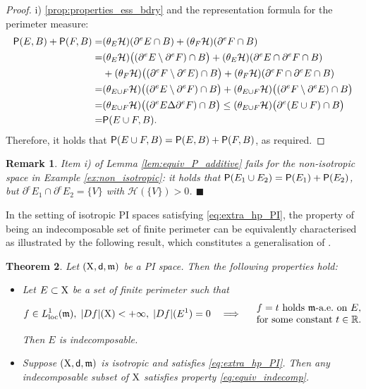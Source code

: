 \documentclass[reqno]{amsart}
\numberwithin{equation}{section}
\newcommand{\R}{\mathbb{R}}
\newcommand{\X}{{\rm X}}
\newcommand{\sfd}{{\sf d}}
\newcommand{\mm}{\mathfrak m}
\newcommand{\1}{\mathbbm 1}
\newcommand{\loc}{{\rm loc}}
\renewcommand{\P}{{\sf P}}
\renewcommand{\H}{{\mathcal H}}
\newcommand{\fr}{\penalty-20\null\hfill\(\blacksquare\)}
\newtheorem{theorem}{Theorem}[section]
\newtheorem{remark}[theorem]{Remark}
\begin{document}
\begin{proof} {\color{blue}i)}
\ref{prop:properties_ess_bdry} and the representation formula for the perimeter measure:
\[\begin{split}
\P(E,B)+\P(F,B)=&(\theta_E\H)(\partial^e E\cap B)+(\theta_F\H)(\partial^e F\cap B)\\
=&(\theta_E\H)\big((\partial^e E\setminus\partial^e F)\cap B\big)+
(\theta_E\H)(\partial^e E\cap\partial^e F\cap B)\\
&+(\theta_F\H)\big((\partial^e F\setminus\partial^e E)\cap B\big)+
(\theta_F\H)(\partial^e F\cap\partial^e E\cap B)\\
=&(\theta_{E\cup F}\H)\big((\partial^e E\setminus\partial^e F)\cap B\big)
+(\theta_{E\cup F}\H)\big((\partial^e F\setminus\partial^e E)\cap B\big)\\
=&(\theta_{E\cup F}\H)\big((\partial^e E\Delta\partial^e F)\cap B\big)
\leq(\theta_{E\cup F}\H)\big(\partial^e(E\cup F)\cap B\big)\\
=&\P(E\cup F,B).
\end{split}\]
Therefore, it holds that \(\P(E\cup F,B)=\P(E,B)+\P(F,B)\), as required.
\end{proof}
%
%
\begin{remark}{\rm
Item i) of Lemma \ref{lem:equiv_P_additive} fails for the non-isotropic space
in Example \ref{ex:non_isotropic}: it holds that
\(\P(E_1\cup E_2)=\P(E_1)+\P(E_2)\), but \(\partial^e E_1\cap\partial^e E_2=\{V\}\)
with \(\H(\{V\})>0\).
\fr}\end{remark}
%
%
In the setting of isotropic PI spaces satisfying \eqref{eq:extra_hp_PI},
the property of being an indecomposable set of finite perimeter can be
equivalently characterised as illustrated by the following result,
which constitutes a generalisation of \cite[Proposition 2.12]{DM95}.
%
%
\begin{theorem}\label{thm:equiv_indecomp}
Let \((\X,\sfd,\mm)\) be a PI space. Then the following properties hold:
\begin{itemize}
\item[\(\rm i)\)] Let \(E\subset\X\) be a set of finite perimeter such that
\begin{equation}\label{eq:equiv_indecomp}
f\in L^1_\loc(\mm),\;|Df|(\X)<+\infty,\;|Df|(E^1)=0\quad\Longrightarrow
\quad\begin{array}{ll}
f=t\text{ holds }\mm\text{-a.e.\ on }E,\\
\text{for some constant }t\in\R.
\end{array}
\end{equation}
Then \(E\) is indecomposable.
\item[\(\rm ii)\)] Suppose \((\X,\sfd,\mm)\) is isotropic and satisfies
\eqref{eq:extra_hp_PI}. Then any indecomposable subset of \(\X\) satisfies
property \eqref{eq:equiv_indecomp}.
\end{itemize}
\end{theorem}
\end{document}
